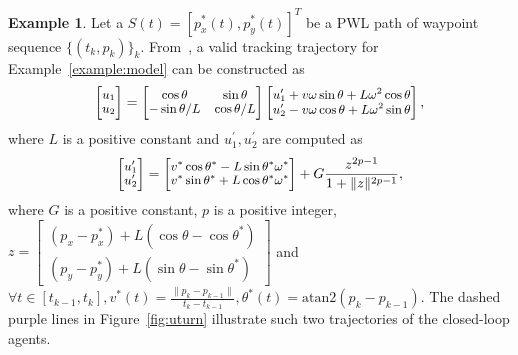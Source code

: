 \documentclass[letterpaper]{article} %
\theoremstyle{definition}
\newtheorem{example}{Example}
\begin{document}
\begin{example}\label{example:controller}
Let a $S(t) = [p^*_x(t), p^*_y(t)]^{T}$ be a PWL path of waypoint sequence $\{(t_k, p_k)\}_k$. From~\cite{rodriguez2014trajectory}, a valid tracking trajectory for Example~\ref{example:model} can be constructed as 
\[\small
\begin{bmatrix}
u_1\\
u_2
\end{bmatrix}=
\begin{bmatrix}
\cos \theta & \sin \theta \\
-\sin \theta/L & \cos \theta/L 
\end{bmatrix}
\begin{bmatrix}
u_1^\prime + v \omega \sin \theta + L \omega^2 \cos \theta \\
u_2^\prime - v \omega \cos \theta + L \omega^2 \sin \theta
\end{bmatrix}
,
\]
where $L$ is a positive constant and $u_1^\prime, u_2^\prime$ are computed as
\[\small
\begin{bmatrix}
u_1^\prime\\
u_2^\prime
\end{bmatrix}=
\begin{bmatrix}
v^* \cos \theta^* - L \sin \theta^* \omega^*\\
v^* \sin \theta^* + L \cos \theta^* \omega^*
\end{bmatrix} +
G\frac{z^{2p-1}}
{1+\|z\|^{2p-1}},
\]
where $G$ is a positive constant, $p$ is a positive integer, {\small$z = \begin{bmatrix}
(p_x - p_x^*) + L (\cos \theta - \cos \theta^*)\\
(p_y - p_y^*) + L (\sin \theta - \sin \theta^*)
\end{bmatrix}$} and $\forall t \in [t_{k-1},t_k], v^*(t) = \frac{\|p_k - p_{k-1}\|}{t_k - t_{k-1}}, \theta^*(t) = \mbox{atan2}(p_{k}-p_{k-1})$.
The dashed purple lines in Figure~\ref{fig:uturn} illustrate such two trajectories of the closed-loop agents.
\end{example}
\end{document}
